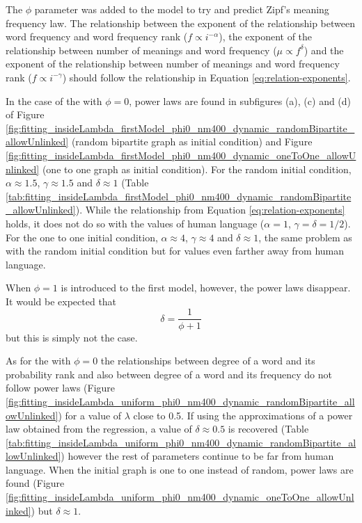 The $\phi$ parameter was added to the model to try and predict Zipf's meaning frequency law. \cite{Ferrer2018a}
The relationship between the exponent of the relationship between word frequency and word frequency rank ($f \propto i^{-\alpha}$), the exponent of the relationship between number of meanings and word frequency ($\mu \propto f^\delta$) and the exponent of the relationship between number of meanings and word frequency rank ($f \propto i^{-\gamma}$) should follow the relationship in Equation \eqref{eq:relation-exponents}.

In the case of the \firstmodel{} with $\phi=0$, power laws are found in subfigures (a), (c) and (d) of Figure \ref{fig:fitting_insideLambda_firstModel_phi0_nm400_dynamic_randomBipartite_allowUnlinked} (random bipartite graph as initial condition) and Figure \ref{fig:fitting_insideLambda_firstModel_phi0_nm400_dynamic_oneToOne_allowUnlinked} (one to one graph as initial condition).
For the random initial condition, $\alpha \approx 1.5$, $\gamma \approx 1.5$ and $\delta \approx 1$ (Table \ref{tab:fitting_insideLambda_firstModel_phi0_nm400_dynamic_randomBipartite_allowUnlinked}). While the relationship from Equation \eqref{eq:relation-exponents} holds, it does not do so with the values of human language ($\alpha=1$, $\gamma=\delta=1/2$).
For the one to one initial condition, $\alpha \approx 4$, $\gamma \approx 4$ and $\delta \approx 1$, the same problem as with the random initial condition but for values even farther away from human language.

When $\phi=1$ is introduced to the first model, however, the power laws disappear.
It would be expected that \cite{Ferrer2018a}
\begin{equation*}
  \delta = \frac{1}{\phi + 1}
\end{equation*}
but this is simply not the case.

As for the \secondmodel{} with $\phi=0$ the relationships between degree of a word and its probability rank and also between degree of a word and its frequency do not follow power laws (Figure \ref{fig:fitting_insideLambda_uniform_phi0_nm400_dynamic_randomBipartite_allowUnlinked}) for a value of $\lambda$ close to 0.5.
If using the approximations of a power law obtained from the regression, a value of $\delta \approx 0.5$ is recovered (Table \ref{tab:fitting_insideLambda_uniform_phi0_nm400_dynamic_randomBipartite_allowUnlinked}) however the rest of parameters continue to be far from human language.
When the initial graph is one to one instead of random, power laws are found (Figure \ref{fig:fitting_insideLambda_uniform_phi0_nm400_dynamic_oneToOne_allowUnlinked}) but $\delta \approx 1$.

